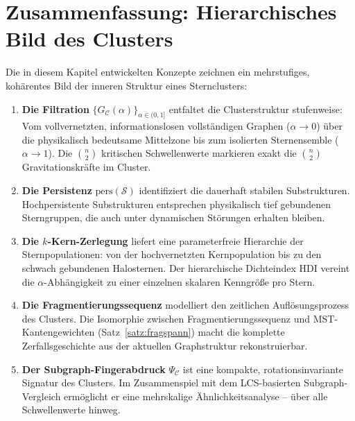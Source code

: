 ﻿\documentclass[a4paper,12pt]{report}
\theoremstyle{definition}
\begin{document}
\section{Zusammenfassung: Hierarchisches Bild des Clusters}
\label{sec:hier_zusammenfassung}

Die in diesem Kapitel entwickelten Konzepte zeichnen ein mehrstufiges, kohärentes Bild der inneren Struktur eines Sternclusters:

\begin{enumerate}
    \item \textbf{Die Filtration} $\{G_\mathcal{C}(\alpha)\}_{\alpha \in (0,1]}$ entfaltet die Clusterstruktur stufenweise: Vom vollvernetzten, informationslosen vollständigen Graphen ($\alpha \to 0$) über die physikalisch bedeutsame Mittelzone bis zum isolierten Sternensemble ($\alpha \to 1$). Die $\binom{n}{2}$ kritischen Schwellenwerte markieren exakt die $\binom{n}{2}$ Gravitationskräfte im Cluster.
    \item \textbf{Die Persistenz} $\mathrm{pers}(\mathcal{S})$ identifiziert die dauerhaft stabilen Substrukturen. Hochpersistente Substrukturen entsprechen physikalisch tief gebundenen Sterngruppen, die auch unter dynamischen Störungen erhalten bleiben.
    \item \textbf{Die $k$-Kern-Zerlegung} liefert eine parameterfreie Hierarchie der Sternpopulationen: von der hochvernetzten Kernpopulation bis zu den schwach gebundenen Halosternen. Der hierarchische Dichteindex HDI vereint die $\alpha$-Abhängigkeit zu einer einzelnen skalaren Kenngröße pro Stern.
    \item \textbf{Die Fragmentierungssequenz} modelliert den zeitlichen Auflösungsprozess des Clusters. Die Isomorphie zwischen Fragmentierungssequenz und MST-Kantengewichten (Satz~\ref{satz:fragspann}) macht die komplette Zerfallsgeschichte aus der aktuellen Graphstruktur rekonstruierbar.
    \item \textbf{Der Subgraph-Fingerabdruck} $\Psi_\mathcal{C}$ ist eine kompakte, rotationsinvariante Signatur des Clusters. Im Zusammenspiel mit dem LCS-basierten Subgraph-Vergleich ermöglicht er eine mehrskalige Ähnlichkeitsanalyse -- über alle Schwellenwerte hinweg.
\end{enumerate}
\end{document}
